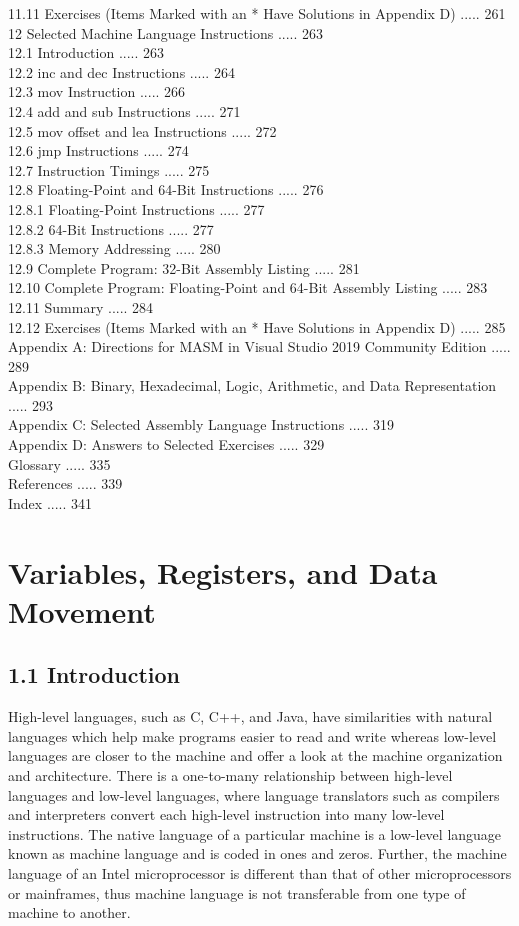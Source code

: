\documentclass[10pt]{article}
\begin{document}
11.11 Exercises (Items Marked with an * Have Solutions in Appendix D) ..... 261\\
12 Selected Machine Language Instructions ..... 263\\
12.1 Introduction ..... 263\\
12.2 inc and dec Instructions ..... 264\\
12.3 mov Instruction ..... 266\\
12.4 add and sub Instructions ..... 271\\
12.5 mov offset and lea Instructions ..... 272\\
12.6 jmp Instructions ..... 274\\
12.7 Instruction Timings ..... 275\\
12.8 Floating-Point and 64-Bit Instructions ..... 276\\
12.8.1 Floating-Point Instructions ..... 277\\
12.8.2 64-Bit Instructions ..... 277\\
12.8.3 Memory Addressing ..... 280\\
12.9 Complete Program: 32-Bit Assembly Listing ..... 281\\
12.10 Complete Program: Floating-Point and 64-Bit Assembly Listing ..... 283\\
12.11 Summary ..... 284\\
12.12 Exercises (Items Marked with an * Have Solutions in Appendix D) ..... 285\\
Appendix A: Directions for MASM in Visual Studio 2019 Community Edition ..... 289\\
Appendix B: Binary, Hexadecimal, Logic, Arithmetic, and Data Representation ..... 293\\
Appendix C: Selected Assembly Language Instructions ..... 319\\
Appendix D: Answers to Selected Exercises ..... 329\\
Glossary ..... 335\\
References ..... 339\\
Index ..... 341

\section*{Variables, Registers, and Data Movement }
\subsection*{1.1 Introduction}
High-level languages, such as C, C++, and Java, have similarities with natural languages which help make programs easier to read and write whereas low-level languages are closer to the machine and offer a look at the machine organization and architecture. There is a one-to-many relationship between high-level languages and low-level languages, where language translators such as compilers and interpreters convert each high-level instruction into many low-level instructions. The native language of a particular machine is a low-level language known as machine language and is coded in ones and zeros. Further, the machine language of an Intel microprocessor is different than that of other microprocessors or mainframes, thus machine language is not transferable from one type of machine to another.
\end{document}
